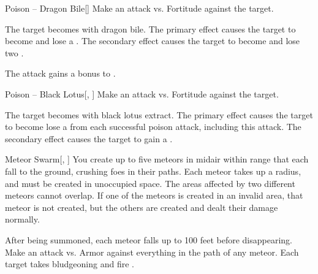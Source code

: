 \lowercase{\hypertarget{spell:Poison -- Dragon Bile}{}}\label{spell:Poison -- Dragon Bile}
\begin{freeability}[Rank 5]{\hypertarget{spell:Poison -- Dragon Bile}{Poison -- Dragon Bile}}[]
Make an attack vs. Fortitude against the target.

\hit The target becomes  with dragon bile.
The primary effect causes the target to become  and lose a .
The secondary effect causes the target to become  and lose two .

\rankline
{} The attack gains a  bonus to .
\end{freeability}
\vspace{0.25em}



\lowercase{\hypertarget{spell:Poison -- Black Lotus}{}}\label{spell:Poison -- Black Lotus}
\begin{freeability}[Rank 7]{\hypertarget{spell:Poison -- Black Lotus}{Poison -- Black Lotus}}[, ]
Make an attack vs. Fortitude against the target.

\hit The target becomes  with black lotus extract.
The primary effect causes the target to become lose a  from each successful poison attack, including this attack.
The secondary effect causes the target to gain a .
\end{freeability}
\vspace{0.25em}



\lowercase{\hypertarget{spell:Meteor Swarm}{}}\label{spell:Meteor Swarm}
\begin{freeability}[Rank 8]{\hypertarget{spell:Meteor Swarm}{Meteor Swarm}}[, ]
You create up to five meteors in midair within \rnglong range that each fall to the ground, crushing foes in their paths.
Each meteor takes up a \areasmall radius, and must be created in unoccupied space.
The areas affected by two different meteors cannot overlap.
If one of the meteors is created in an invalid area, that meteor is not created, but the others are created and dealt their damage normally.

After being summoned, each meteor falls up to 100 feet before disappearing.
Make an attack vs. Armor against everything in the path of any meteor.
\hit Each target takes bludgeoning and fire .
\end{freeability}
\vspace{0.25em}



